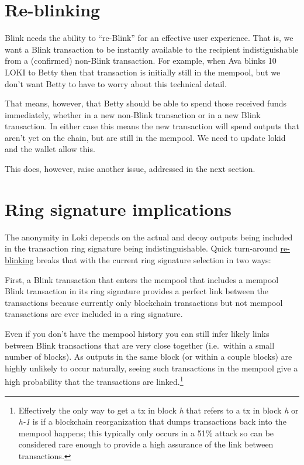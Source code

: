 \hypertarget{re-blinking}{%
\section{Re-blinking}\label{re-blinking}}

Blink needs the ability to ``re-Blink'' for an effective user
experience. That is, we want a Blink transaction to be instantly
available to the recipient indistiguishable from a (confirmed) non-Blink
transaction. For example, when Ava blinks 10 LOKI to Betty then that
transaction is initially still in the mempool, but we don't want Betty
to have to worry about this technical detail.

That means, however, that Betty should be able to spend those received
funds immediately, whether in a new non-Blink transaction or in a new
Blink transaction. In either case this means the new transaction will
spend outputs that aren't yet on the chain, but are still in the
mempool. We need to update lokid and the wallet allow this.

This does, however, raise another issue, addressed in the next section.

\hypertarget{ring-signature-implications}{%
\section{Ring signature
implications}\label{ring-signature-implications}}

The anonymity in Loki depends on the actual and decoy outputs being
included in the transaction ring signature being indistinguishable.
Quick turn-around \protect\hyperlink{re-blinking}{re-blinking} breaks
that with the current ring signature selection in two ways:

First, a Blink transaction that enters the mempool that includes a
mempool Blink transaction in its ring signature provides a perfect link
between the transactions because currently only blockchain transactions
but not mempool transactions are ever included in a ring signature.

Even if you don't have the mempool history you can still infer likely
links between Blink transactions that are very close together
(i.e.~within a small number of blocks). As outputs in the same block (or
within a couple blocks) are highly unlikely to occur naturally, seeing
such transactions in the mempool give a high probability that the
transactions are linked.\footnote{Effectively the only way to get a tx
  in block \emph{h} that refers to a tx in block \emph{h} or \emph{h-1}
  is if a blockchain reorganization that dumps transactions back into
  the mempool happens; this typically only occurs in a 51\% attack so
  can be considered rare enough to provide a high assurance of the link
  between transactions.}

